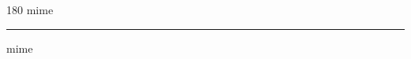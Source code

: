 
\begin{frame}
\begin{center}
\begin{turn}{180}
{\fontsize{2.5cm}{1em}\selectfont mime}
\end{turn}
\vspace{1em}\par  
\hrule
\vspace{1em}\par  
{\fontsize{2.5cm}{1em}\selectfont mime}
\end{center}
\end{frame}
